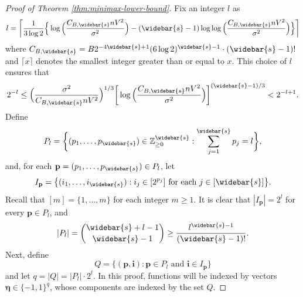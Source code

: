 \documentclass[10pt]{article}
\newcommand{\pbf}{{\mathbf{p}}}
\newcommand{\ibf}{{\mathbf{i}}}
\newcommand{\etabf}{{\boldsymbol{\eta}}}
\newcommand{\ceil}[1]{\lceil #1 \rceil}
\begin{document}
\begin{proof}[Proof of Theorem \ref{thm:minimax-lower-bound}]
Fix an integer $l$ as 
\begin{equation*}
    l = \bigg\lceil\frac{1}{3 \log 2} \Big\{\log\Big(
    \frac{C_{B, \widebar{s}} n V^2}{\sigma^2}\Big) 
    - (\widebar{s} - 1) \log\log\Big(
    \frac{C_{B, \widebar{s}} n V^2}{\sigma^2}
    \Big)\Big\}\bigg\rceil
\end{equation*}
where $C_{B, \widebar{s}} = B 2^{-4\widebar{s} + 1} 
(6 \log 2)^{\widebar{s} - 1} \cdot (\widebar{s} - 1)!$ and 
$\ceil{x}$ denotes the smallest integer greater than or equal to $x$. 
This choice of $l$ ensures that
\begin{equation}\label{2-minus-l}
    2^{-l} \le \Big(\frac{\sigma^2}{C_{B, \widebar{s}} n V^2}\Big)^{1/3} 
    \bigg[\log\Big(\frac{C_{B, \widebar{s}} 
    n V^2}{\sigma^2}\Big)\bigg]^{(\widebar{s} - 1)/3} 
    < 2^{-l + 1}.
\end{equation} 
Define 
\begin{equation*}
    P_l = \bigg\{(p_1, \dots, p_{\widebar{s}}) 
    \in \mathbb{Z}_{\ge 0}^{\widebar{s}}: 
    \sum_{j = 1}^{\widebar{s}} p_j = l\bigg\},
\end{equation*}
and, for each $\pbf = (p_1, \dots, p_{\widebar{s}}) \in P_l$, let 
\begin{equation*}
    I_{\pbf} = \big\{(i_1, \dots, i_{\widebar{s}}): i_j \in [2^{p_j}] 
    \mbox{ for each } j \in [\widebar{s}] \big\}.
\end{equation*}
Recall that $[m] = \{1, \dots, m\}$ for each integer $m \ge 1$. It is 
clear that $|I_{\pbf}| = 2^l$ for every $\pbf \in P_l$, and 
\begin{equation*}
    |P_l| = \binom{\widebar{s} + l - 1}{\widebar{s} - 1} 
    \ge \frac{l^{\widebar{s}- 1}}{(\widebar{s} - 1)!}.
\end{equation*}
Next, define
\begin{equation*}
    Q = \big\{(\pbf, \ibf): 
    \pbf \in P_l \mbox{ and } \ibf \in I_{\pbf} \big\}
\end{equation*}
and let $q = |Q| = |P_l| \cdot 2^l$.
In this proof, functions will be indexed by vectors $\etabf \in \{-1, 1\}^q$, 
whose components are indexed by the set $Q$.


\end{proof}
\end{document}
